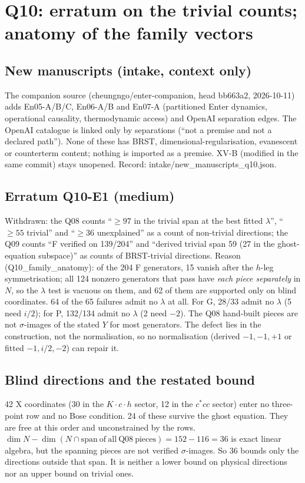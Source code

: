 \section{Q10: erratum on the trivial counts; anatomy of the family vectors}
\subsection*{New manuscripts (intake, context only)}
The companion source (cheungngo/enter-companion, head bb663a2, 2026-10-11) adds En05-A/B/C, En06-A/B and En07-A
(partitioned Enter dynamics, operational causality, thermodynamic access) and OpenAI separation edges. The OpenAI
catalogue is linked only by separations (``not a premise and not a declared path''). None of these has BRST,
dimensional-regularisation, evanescent or counterterm content; nothing is imported as a premise. XV-B (modified in the
same commit) stays unopened. Record: intake/new\_manuscripts\_q10.json.
\subsection*{Erratum Q10-E1 (medium)}
Withdrawn: the Q08 counts ``$\geq97$ in the trivial span at the best fitted $\lambda$'', ``$\geq55$ trivial'' and
``$\geq36$ unexplained'' as a count of non-trivial directions; the Q09 counts ``F verified on 139/204'' and ``derived
trivial span 59 (27 in the ghost-equation subspace)'' as counts of BRST-trivial directions.
Reason (Q10\_family\_anatomy): of the 204 F generators, 15 vanish after the $h$-leg symmetrisation; all 124 nonzero
generators that pass have \emph{each piece separately} in $N$, so the $\lambda$ test is vacuous on them, and 62 of them
are supported only on blind coordinates. 64 of the 65 failures admit no $\lambda$ at all. For G, 28/33 admit no
$\lambda$ (5 need $i/2$); for P, 132/134 admit no $\lambda$ (2 need $-2$). The Q08 hand-built pieces are not
$\sigma$-images of the stated $Y$ for most generators. The defect lies in the construction, not the normalisation, so no
normalisation (derived $-1,-1,+1$ or fitted $-1,i/2,-2$) can repair it.
\subsection*{Blind directions and the restated bound}
42 X coordinates (30 in the $K\!\cdot\!c\!\cdot\!h$ sector, 12 in the $c^*\!cc$ sector) enter no three-point row and
no Bose condition. 24 of these survive the ghost equation. They are free at this order and unconstrained by the
rows. $\dim N-\dim(N\cap\mathrm{span\ of\ all\ Q08\ pieces})=152-116=36$ is exact linear algebra, but the spanning
pieces are not verified $\sigma$-images. So 36 bounds only the directions outside that span. It is neither a lower
bound on physical directions nor an upper bound on trivial ones.
